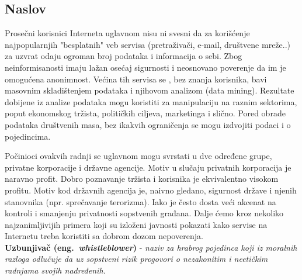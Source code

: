\documentclass[a4paper]{article}
\begin{document}
\subsection{Naslov}
\label{subsec:podnaslovIP4}

\indent\indent Prosečni korisnici Interneta uglavnom nisu ni svesni da za korišćenje najpopularnjih "besplatnih" veb servisa (pretraživači, e-mail, društvene mreže..) za uzvrat odaju ogroman broj podataka i informacija o sebi. Zbog neinformisanosti imaju lažan osećaj sigurnosti i neosnovano poverenje da im je omogućena anonimnost. Većina tih servisa se , bez znanja korisnika,  bavi masovnim skladištenjem podataka i njihovom analizom (data mining\cite{?}). Rezultate dobijene iz analize podataka mogu koristiti za manipulaciju na raznim sektorima, poput ekonomskog tržista, političkih ciljeva, marketinga i slično. Pored obrade podataka društvenih masa, bez ikakvih ograničenja se mogu izdvojiti podaci i o pojedincima.
		
	Počinioci ovakvih radnji se uglavnom mogu svrstati u dve određene grupe, privatne korporacije i državne agencije. Motiv u slučaju privatnih korporacija je naravno profit. Dobro poznavanje tržista i korisnika je ekvivalentno visokom profitu. Motiv kod državnih agencija je, naivno gledano, sigurnost države i njenih stanovnika (npr. sprečavanje terorizma). Iako je često dosta veći akcenat na kontroli i smanjenju privatnosti sopstvenih građana. Dalje ćemo kroz nekoliko najzanimljivijih primera koji su izloženi javnosti pokazati kako servise na Internetu treba koristiti sa dobrom dozom nepoverenja.\\
	
\textbf{Uzbunjivač (eng.~{\em whistleblower})} - \textit{naziv za hrabrog pojedinca koji iz moralnih razloga odlučuje da uz sopstveni rizik progovori o nezakonitim i neetičkim radnjama svojih nadređenih.} \cite{?}
\end{document}

